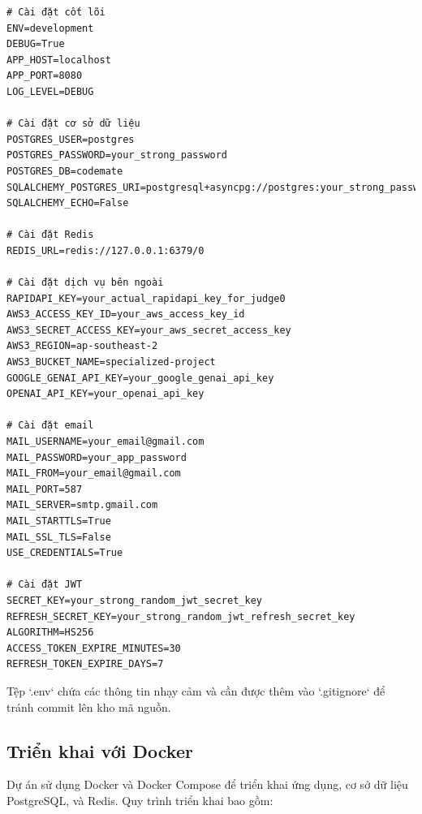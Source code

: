 \begin{verbatim}
# Cài đặt cốt lõi
ENV=development
DEBUG=True
APP_HOST=localhost
APP_PORT=8080
LOG_LEVEL=DEBUG

# Cài đặt cơ sở dữ liệu
POSTGRES_USER=postgres
POSTGRES_PASSWORD=your_strong_password
POSTGRES_DB=codemate
SQLALCHEMY_POSTGRES_URI=postgresql+asyncpg://postgres:your_strong_password@127.0.0.1:5433/codemate
SQLALCHEMY_ECHO=False

# Cài đặt Redis
REDIS_URL=redis://127.0.0.1:6379/0

# Cài đặt dịch vụ bên ngoài
RAPIDAPI_KEY=your_actual_rapidapi_key_for_judge0
AWS3_ACCESS_KEY_ID=your_aws_access_key_id
AWS3_SECRET_ACCESS_KEY=your_aws_secret_access_key
AWS3_REGION=ap-southeast-2
AWS3_BUCKET_NAME=specialized-project
GOOGLE_GENAI_API_KEY=your_google_genai_api_key
OPENAI_API_KEY=your_openai_api_key

# Cài đặt email
MAIL_USERNAME=your_email@gmail.com
MAIL_PASSWORD=your_app_password
MAIL_FROM=your_email@gmail.com
MAIL_PORT=587
MAIL_SERVER=smtp.gmail.com
MAIL_STARTTLS=True
MAIL_SSL_TLS=False
USE_CREDENTIALS=True

# Cài đặt JWT
SECRET_KEY=your_strong_random_jwt_secret_key
REFRESH_SECRET_KEY=your_strong_random_jwt_refresh_secret_key
ALGORITHM=HS256
ACCESS_TOKEN_EXPIRE_MINUTES=30
REFRESH_TOKEN_EXPIRE_DAYS=7
\end{verbatim}

Tệp `.env` chứa các thông tin nhạy cảm và cần được thêm vào `.gitignore` để tránh commit lên kho mã nguồn.

\subsection*{Triển khai với Docker}

Dự án sử dụng Docker và Docker Compose để triển khai ứng dụng, cơ sở dữ liệu PostgreSQL, và Redis. Quy trình triển khai bao gồm:

